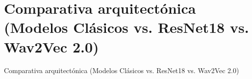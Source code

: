 \section{Comparativa arquitectónica (Modelos Clásicos vs. ResNet18 vs. Wav2Vec 2.0)}
    Comparativa arquitectónica (Modelos Clásicos vs. ResNet18 vs. Wav2Vec 2.0)
